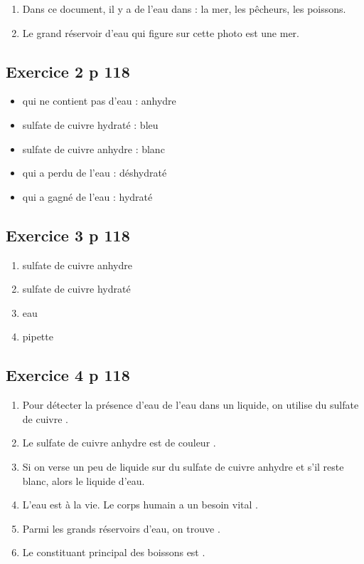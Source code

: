 \documentclass[12pt,a4paper]{article}
\begin{document}
\begin{enumerate}[label=\alph*)]
	\item Dans ce document, il y a de l'eau dans : la mer, les pêcheurs, les poissons.
	\item Le grand réservoir d'eau qui figure sur cette photo est une mer.
\end{enumerate}

\subsection*{Exercice 2 p 118}

\begin{multicols}{2}
	\begin{itemize}
		\item qui ne contient pas d'eau : anhydre
		\item sulfate de cuivre hydraté : bleu
		\item sulfate de cuivre anhydre : blanc
		\item qui a perdu de l'eau : déshydraté
		\item qui a gagné de l'eau : hydraté
	\end{itemize}
\end{multicols}

\subsection*{Exercice 3 p 118}
\begin{multicols}{2}
	\begin{enumerate}[label=\arabic*)]
		\item sulfate de cuivre anhydre
		\item sulfate de cuivre hydraté
		\item eau
		\item pipette
	\end{enumerate}
\end{multicols}

\subsection*{Exercice 4 p 118}


	\begin{enumerate}[label=\alph*)]
		\item Pour détecter la présence d'eau de l'eau dans un liquide, on utilise du sulfate de cuivre .
		
		\item Le sulfate de cuivre anhydre est de couleur .
		\item Si on verse un peu de liquide sur du sulfate de cuivre anhydre et s'il reste blanc, alors le liquide  d'eau.
		\item L'eau est  à la vie. Le corps humain a un besoin vital .
		\item Parmi les grands réservoirs d'eau, on trouve .
		\item Le constituant principal des boissons est .
	\end{enumerate}
\end{document}
